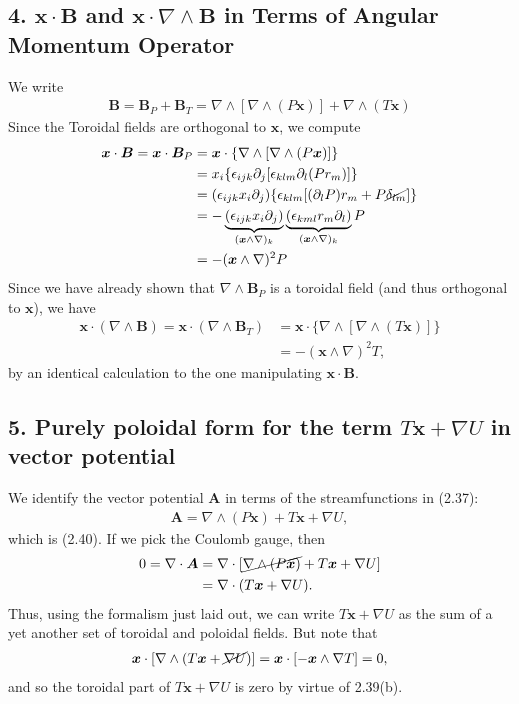 \documentclass[12pt]{article} %
\begin{document}
\subsection*{4. $\bm{x}\cdot \bm{B}$ and $\bm{x}\cdot\nabla\wedge\bm{B}$ in Terms of Angular Momentum Operator}
We write
\begin{align*}
\bm{B} = \bm{B}_P + \bm{B}_T = \nabla\wedge[\nabla\wedge(P\bm{x})] + \nabla\wedge(T\bm{x})
\end{align*}
Since the Toroidal fields are orthogonal to $\bm{x}$, we compute
\begin{align*}
\bm{x}\cdot\bm{B} = \bm{x}\cdot \bm{B}_P &= \bm{x}\cdot\{\nabla\wedge[\nabla\wedge(P\bm{x})]\} \\
&= x_i\{\epsilon_{ijk}\partial_j[\epsilon_{klm}\partial_l(Pr_m)]\}\\
&= (\epsilon_{ijk}x_i\partial_j)\{\epsilon_{klm}[(\partial_lP)r_m + P\cancel{\delta_{lm}}]\}\\
&= -\underbrace{(\epsilon_{ijk} x_i\partial_j)}_{(\bm{x}\wedge\nabla)_k} \underbrace{(\epsilon_{kml}r_m\partial_l)}_{(\bm{x}\wedge\nabla)_k}P\\
&= -(\bm{x}\wedge\nabla)^2P
\end{align*}
Since we have already shown that $\nabla\wedge \bm{B}_P$ is a toroidal field (and thus orthogonal to $\bm{x}$), we have
\begin{align*}
\bm{x}\cdot(\nabla\wedge\bm{B}) = \bm{x}\cdot(\nabla\wedge \bm{B}_T) &= \bm{x}\cdot\{\nabla\wedge[\nabla\wedge(T\bm{x})]\}\\
&=  -(\bm{x}\wedge\nabla)^2T, 
\end{align*}
by an identical calculation to the one manipulating $\bm{x}\cdot\bm{B}$. 

\subsection*{5. Purely poloidal form for the term $T\bm{x} + \nabla U$ in vector potential}
We identify the vector potential $\bm{A}$ in terms of the streamfunctions in (2.37):
\begin{align*}
\bm{A} = \nabla\wedge(P\bm{x}) + T\bm{x} + \nabla U,
\end{align*}
which is (2.40). If we pick the Coulomb gauge, then 
\begin{align*}
0 = \nabla\cdot\bm{A} &= \nabla\cdot[\cancel{\nabla\wedge(P\bm{x})} + T\bm{x} + \nabla U]\\
&= \nabla\cdot(T\bm{x} + \nabla U). 
\end{align*}
Thus, using the formalism just laid out, we can write $T\bm{x} + \nabla U$ as the sum of a yet another set of toroidal and poloidal fields. But note that 
\begin{align*}
\bm{x}\cdot[\nabla\wedge(T\bm{x} + \cancel{\nabla U})] = \bm{x}\cdot[-\bm{x}\wedge\nabla T] = 0,
\end{align*} 
and so the toroidal part of $T\bm{x} + \nabla U$ is zero by virtue of 2.39(b). 
\end{document}
